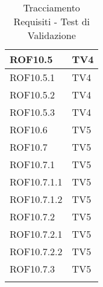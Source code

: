 \begin{center}
\begin{longtable}{|p{7cm}|p{7cm}|}
\midrule
ROF10.5 & TV4\\
\midrule
ROF10.5.1 & TV4\\
\midrule
ROF10.5.2 & TV4\\
\midrule
ROF10.5.3 & TV4\\
\midrule
ROF10.6 & TV5\\
\midrule
ROF10.7 & TV5\\
\midrule
ROF10.7.1 & TV5\\
\midrule
ROF10.7.1.1 & TV5\\
\midrule
ROF10.7.1.2 & TV5\\
\midrule
ROF10.7.2 & TV5\\
\midrule
ROF10.7.2.1 & TV5\\
\midrule
ROF10.7.2.2 & TV5\\
\midrule
ROF10.7.3 & TV5\\

\bottomrule
\caption{Tracciamento Requisiti - Test di Validazione}
\label{tab:changelog}
\end{longtable}
\end{center}
